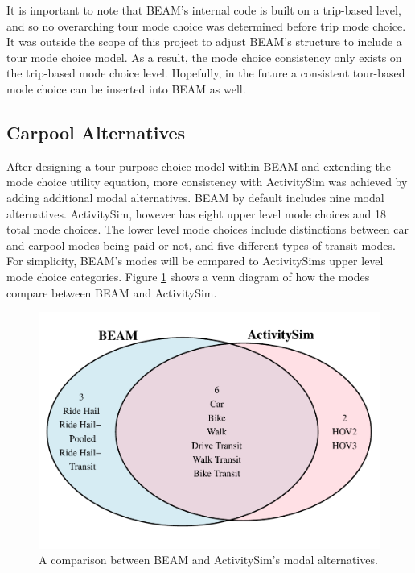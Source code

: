 \documentclass[12pt, oneside, openright]{byuthesis}
\begin{document}
It is important to note that BEAM's internal code is built on a trip-based level, and so no overarching tour mode choice was determined before trip mode choice. It was outside the scope of this project to adjust BEAM's structure to include a tour mode choice model. As a result, the mode choice consistency only exists on the trip-based mode choice level. Hopefully, in the future a consistent tour-based mode choice can be inserted into BEAM as well.

\hypertarget{pool}{%
\subsection{Carpool Alternatives}\label{pool}}

After designing a tour purpose choice model within BEAM and extending the mode choice utility equation, more consistency with ActivitySim was achieved by adding additional modal alternatives. BEAM by default includes nine modal alternatives. ActivitySim, however has eight upper level mode choices and 18 total mode choices. The lower level mode choices include distinctions between car and carpool modes being paid or not, and five different types of transit modes. For simplicity, BEAM's modes will be compared to ActivitySims upper level mode choice categories. Figure \ref{fig:venn} shows a venn diagram of how the modes compare between BEAM and ActivitySim.

\begin{figure}

{\centering \includegraphics{thesis_files/figure-latex/venn-1} 

}

\caption{A comparison between BEAM and ActivitySim's modal alternatives.}\label{fig:venn}
\end{figure}
\end{document}
